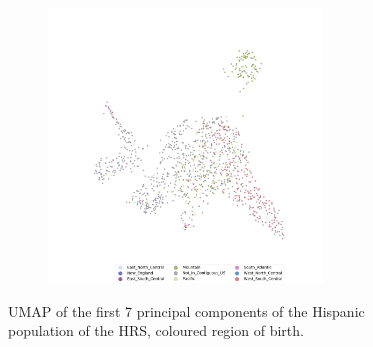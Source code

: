 \documentclass[12pt]{pnas-new}
\begin{document}
\begin{figure}
    \centering
    \begin{subfigure}{\textwidth}
    \includegraphics[width=0.8\textwidth]{images/HRS_1000G_NP1_UMAP_PC7_NC2_NN15_MD05_pca_hrshisp_added1kgp_2018115153245_1kgp_hisp_birthonly.jpeg}
    \end{subfigure}
    \caption{UMAP of the first 7 principal components of the Hispanic population of the HRS, coloured region of birth.}
    \label{fig:supp_umap_hrs_hisp_birth}
\end{figure}
\end{document}
